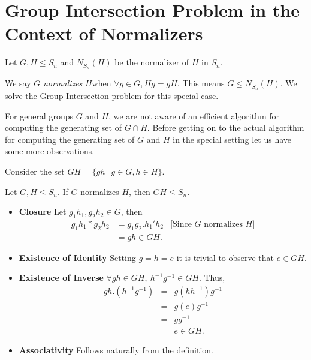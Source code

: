 \section{Group Intersection Problem in the Context of Normalizers}

Let $G,H\leq S_n$ and $N_{S_{n}}(H)$ be the normalizer of $H$ in $S_n$. 

We say $G$ \emph{normalizes} $H$when $\forall g\in G, Hg = gH$. This means $G\leq N_{S_{n}}(H)$. We solve the Group Intersection problem
for this special case.


For general groups $G$ and $H$, we are not aware of an efficient algorithm for computing the generating set of $G\cap H$. Before getting on to the actual algorithm for computing the generating set of $G$ and $H$ in the special setting let us have some more observations.

Consider the set $GH = \{gh~|~g\in G, h\in H\}$. 
\begin{observation}
\label{obs-GH}
Let $G,H\leq S_n$. If $G$ normalizes $H$, then $GH\leq S_n$.
\begin{itemize}
	\item {\bf Closure} Let $g_1h_1,g_2h_2\in G$, then
	\begin{eqnarray*}
		g_1h_1*g_2h_2 &= g_1g_2.h_1'h_2 & \text{[Since $G\text{ normalizes }H$]}\\
		&= gh\in GH.
	\end{eqnarray*}
	\item {\bf Existence of Identity} Setting $g = h = e$ it is trivial to observe that $e\in GH$.
	\item {\bf Existence of Inverse} $\forall gh\in GH,~ h^{-1}g^{-1}\in GH$. Thus,
	\begin{eqnarray*}
		gh.(h^{-1}g^{-1}) &=& g(hh^{-1})g^{-1}\\
						  &=& g(e)g^{-1}\\
						  &=& gg^{-1}\\
						  &=& e\in GH.
	\end{eqnarray*} 
	\item {\bf Associativity} Follows naturally from the definition.
\end{itemize}
\end{observation}

